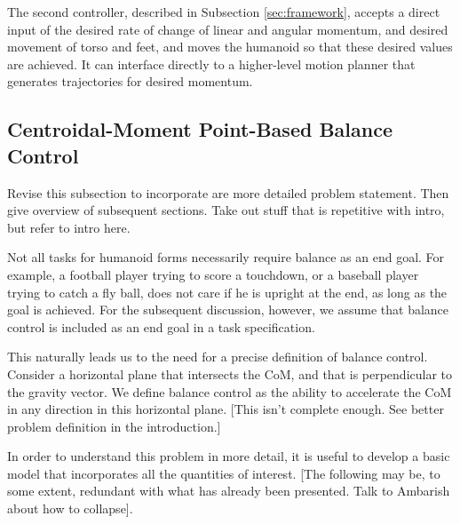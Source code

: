 \documentclass{llncs}
\begin{document}

The second controller, described in Subsection \ref{sec:framework}, accepts a direct input of the desired
rate of change of linear and angular momentum, and desired movement of torso and feet, and moves the 
humanoid so that these desired values are achieved.  It can interface directly to a higher-level
motion planner that generates trajectories for desired momentum.



\subsection{Centroidal-Moment Point-Based Balance Control }
\label{sec:CentroidalMomentPointControl}


Revise this subsection to incorporate are more detailed problem statement.  Then give overview of 
subsequent sections.  Take out stuff that is repetitive with intro, but refer to intro here.




Not all tasks for humanoid forms necessarily require balance as an end goal. 
For example, a football player trying to score a touchdown, or a baseball player trying to catch a fly ball,
does not care if he is upright at the end, as long as the goal is achieved.
For the subsequent discussion, however, we assume that balance control is included as an end goal in a task specification.

This naturally leads us to the need for a precise definition of balance control.
Consider a horizontal plane that intersects the CoM, and that is perpendicular to the gravity vector.
We define balance control as the ability to accelerate the CoM in any direction in this 
horizontal plane.
[This isn't complete enough.  See better problem definition in the introduction.]



In order to understand this problem in more detail, it is useful to develop a basic model that incorporates
all the quantities of interest.
[The following may be, to some extent, redundant with what has already been presented.
Talk to Ambarish about how to collapse].
\end{document}
